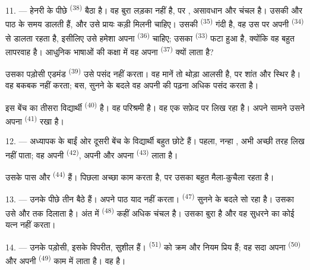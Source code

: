\VUsaut{4.2mm}
\VUsaut{3.2mm}

11. --- हेनरी के पीछे  \textsuperscript{(38)} बैठा है। वह बुरा लड़का
नहीं है, पर , असावधान और चंचल है। उसकी  और
 पाठ के समय  डालती हैं, और उसे प्रायः कड़ी
 मिलनी चाहिए। उसकी  \textsuperscript{(35)} गंदी
है, वह उस पर अपनी  \textsuperscript{(34)} से 
डालता रहता है, इसीलिए उसे हमेशा अपना  \textsuperscript{(36)} चाहिए;
उसका  \textsuperscript{(33)} फटा हुआ है, क्योंकि वह बहुत लापरवाह है।
आधुनिक भाषाओं की कक्षा में वह अपना  \textsuperscript{(37)} क्यों
लाता है?

उसका पड़ोसी एडमंड \textsuperscript{(39)} उसे पसंद नहीं करता। वह मानें तो थोड़ा
आलसी है, पर शांत और स्थिर है। वह बकबक नहीं करता; बस, सुनने के बदले वह अपनी
 की  पढ़ना अधिक पसंद करता है।

इस बेंच का तीसरा विद्यार्थी  \textsuperscript{(40)} है। वह परिश्रमी
है। वह  एक सफ़ेद  पर लिख रहा है। अपने सामने उसने
अपना  \textsuperscript{(41)} रखा है।

12. --- अध्यापक के बाईं ओर दूसरी बेंच के विद्यार्थी बहुत छोटे हैं। पहला, नन्हा
, अभी अच्छी तरह लिख नहीं पाता; वह अपनी 
\textsuperscript{(42)}, अपनी  और अपना 
\textsuperscript{(43)} लाता है।

उसके पास  और  \textsuperscript{(44)} हैं। पिछला अच्छा
काम करता है, पर उसका  बहुत मैला-कुचैला रहता है।

13. --- उनके पीछे तीन  बैठे हैं।  अपने पाठ याद नहीं
करता।  \textsuperscript{(47)} सुनने के बदले सो रहा है। उसका
 उसे  और  तक दिलाता है। अंत में
 \textsuperscript{(48)} कहीं अधिक चंचल है। उसका 
बुरा है और वह सुधरने का कोई यत्न नहीं करता।

14. --- उनके पड़ोसी, इसके विपरीत, सुशील हैं। 
\textsuperscript{(51)} को क्रम और नियम प्रिय हैं; वह सदा अपना 
\textsuperscript{(50)} और अपनी  \textsuperscript{(49)} काम में लाता है।
वह  है।

